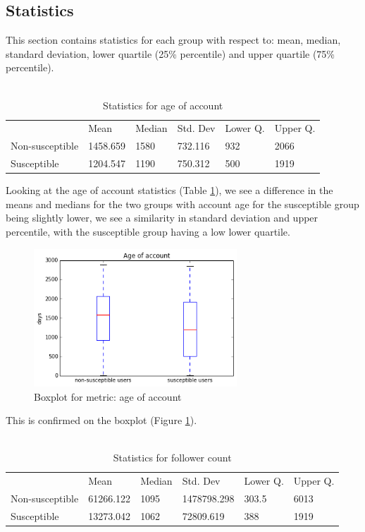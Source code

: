 \documentclass[10pt]{IEEEtran}
\begin{document}
\subsection{Statistics}
This section contains statistics for each group with respect to: mean, median, standard deviation,  lower quartile (25\% percentile) and upper quartile (75\% percentile).\\\\


\begin{table}[H]
\begin{tabular}{llllll}
\textbf{}       & Mean     & Median & Std. Dev & Lower Q. & Upper Q. \\
Non-susceptible & 1458.659 & 1580   & 732.116  & 932     & 2066      \\
Susceptible     & 1204.547 & 1190   & 750.312  &  500    &   1919   
\end{tabular}
\caption{Statistics for age of account}
\label{tab:age_of_account}
\end{table}

Looking at the age of account statistics (Table \ref{tab:age_of_account}), we see a difference in the means and medians for the two groups with account age for the susceptible group being slightly lower, we see a similarity in standard deviation and upper percentile, with the susceptible group having a low lower quartile.

\begin{figure}[H]
  \centering
  \includegraphics[width=3.0in]{age_of_account_boxplot}
  \caption{Boxplot for metric: age of account}
  \label{fig:age_boxplot}
\end{figure}
This is confirmed on the boxplot (Figure \ref{fig:age_boxplot}).\\\\
\begin{table}[H]

\begin{tabular}{llllll}
\textbf{}       & Mean      & Median & Std. Dev    & Lower Q. & Upper Q. \\
Non-susceptible & 61266.122 & 1095   & 1478798.298 & 303.5    &  6013    \\
Susceptible     & 13273.042 & 1062   & 72809.619   & 388     &   1919   
\end{tabular}
\caption{Statistics for follower count}
\label{tab:follower_count}
\end{table}
\end{document}
